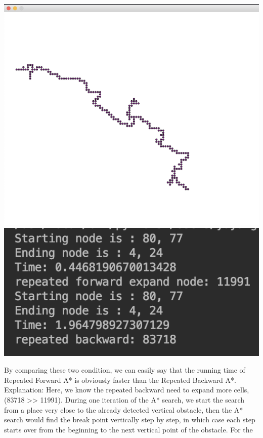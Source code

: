 \documentclass{article}
\begin{document}
\includegraphics[scale = 0.70]{backward2.PNG}
\newline
\includegraphics[scale = 0.70]{Output.PNG}
\newline
\par By comparing these two condition, we can easily say that the running time of Repeated Forward A* is obviously faster than the Repeated Backward A*.
\newline
\newline
Explanation: Here, we know the repeated backward need to expand more cells, (83718 >> 11991). During one iteration of the A* search, we start the search from a place very close to the already detected vertical obstacle, then the A* search would find the break point vertically step by step, in which case each step starts over from the beginning to the next vertical point of the obstacle. For the 
\end{document}
